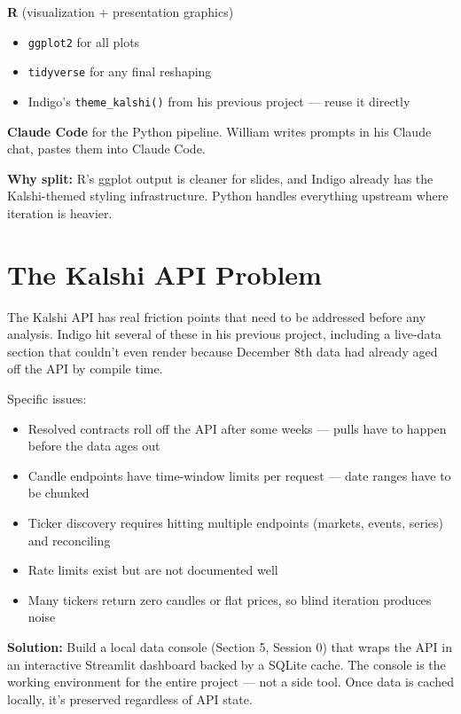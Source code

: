 \documentclass[11pt]{article}
\begin{document}
\textbf{R} (visualization + presentation graphics)
\begin{itemize}[leftmargin=*, itemsep=0pt]
    \item \texttt{ggplot2} for all plots
    \item \texttt{tidyverse} for any final reshaping
    \item Indigo's \texttt{theme\_kalshi()} from his previous project --- reuse it directly
\end{itemize}

\textbf{Claude Code} for the Python pipeline. William writes prompts in his Claude chat, pastes them into Claude Code.

\textbf{Why split:} R's ggplot output is cleaner for slides, and Indigo already has the Kalshi-themed styling infrastructure. Python handles everything upstream where iteration is heavier.

\section{The Kalshi API Problem}

The Kalshi API has real friction points that need to be addressed before any analysis. Indigo hit several of these in his previous project, including a live-data section that couldn't even render because December 8th data had already aged off the API by compile time.

Specific issues:
\begin{itemize}[leftmargin=*, itemsep=0pt]
    \item Resolved contracts roll off the API after some weeks --- pulls have to happen before the data ages out
    \item Candle endpoints have time-window limits per request --- date ranges have to be chunked
    \item Ticker discovery requires hitting multiple endpoints (markets, events, series) and reconciling
    \item Rate limits exist but are not documented well
    \item Many tickers return zero candles or flat prices, so blind iteration produces noise
\end{itemize}

\textbf{Solution:} Build a local data console (Section 5, Session 0) that wraps the API in an interactive Streamlit dashboard backed by a SQLite cache. The console is the working environment for the entire project --- not a side tool. Once data is cached locally, it's preserved regardless of API state.
\end{document}
